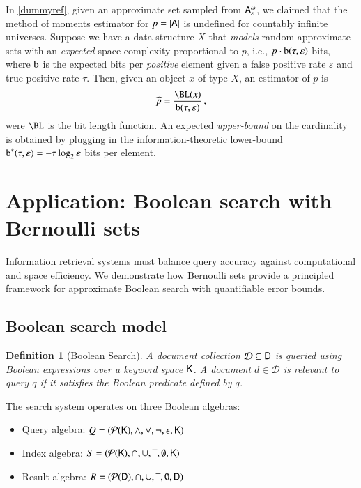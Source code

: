 \documentclass[10pt,final,hidelinks]{article}
\numberwithin{equation}{section}
\DeclarePairedDelimiter\Card{\lvert}{\rvert}
\newcommand{\p}{p}
\newcommand{\tprate}{\tau}
\newcommand{\fprate}{\varepsilon}
\newcommand{\fnrate}{\omega}
\newcommand{\envnumstyle}{chapter}
\renewcommand{\envnumstyle}{chapter}
\renewcommand{\envnumstyle}{section}
\theoremstyle{plain}
\newtheorem{definition}{Definition}[\envnumstyle]
\begin{document}
In \cref{dummyref}, given an approximate set sampled from $\ASet{A}[\fprate][\fnrate]$, we claimed that the method of moments estimator for $\p = \Card{\Set{A}}$ is undefined for countably infinite universes.
Suppose we have a data structure $X$ that \emph{models} random approximate sets with an \emph{expected} space complexity proportional to $\p$, i.e., $\p \cdot \Fun{b}(\tprate,\fprate)$ bits, where $\Fun{b}$ is the expected bits per \emph{positive} element given a false positive rate $\fprate$ and true positive rate $\tprate$.
Then, given an object $x$ of type $X$, an estimator of $\p$ is
\begin{equation}
	\widehat{\p} = \frac{\BL(x)}{\Fun{b}(\tprate,\fprate)}\,,
\end{equation}
were $\BL$ is the bit length function.
An expected \emph{upper-bound} on the cardinality is obtained by plugging in the information-theoretic lower-bound $\Fun{b}^{*}(\tprate,\fprate) = -\tprate \log_2 \fprate$ bits per element.


\section{Application: Boolean search with Bernoulli sets}
\label{sec:bool_search}

Information retrieval systems must balance query accuracy against computational and space efficiency. We demonstrate how Bernoulli sets provide a principled framework for approximate Boolean search with quantifiable error bounds.

\subsection{Boolean search model}

\begin{definition}[Boolean Search]
A document collection $\mathcal{D} \subseteq \Set{D}$ is queried using Boolean expressions over a keyword space $\Set{K}$. A document $d \in \mathcal{D}$ is relevant to query $q$ if it satisfies the Boolean predicate defined by $q$.
\end{definition}

The search system operates on three Boolean algebras:
\begin{itemize}
\item Query algebra: $Q = (\mathcal{P}(\Set{K}), \land, \lor, \neg, \epsilon, \Set{K})$
\item Index algebra: $S = (\mathcal{P}(\Set{K}), \cap, \cup, \overline{\phantom{x}}, \emptyset, \Set{K})$
\item Result algebra: $R = (\mathcal{P}(\Set{D}), \cap, \cup, \overline{\phantom{x}}, \emptyset, \Set{D})$
\end{itemize}
\end{document}
